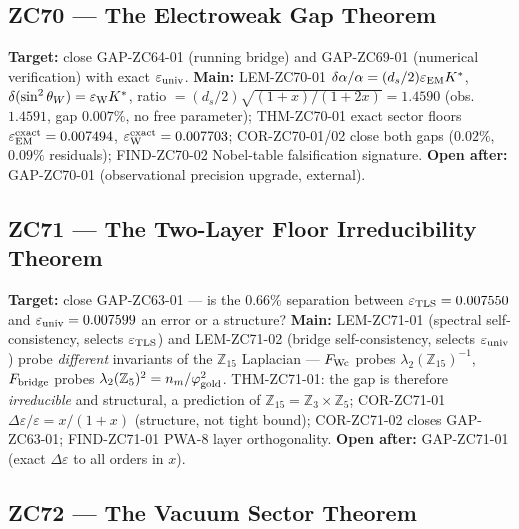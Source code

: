 \documentclass[11pt, a4paper]{article}
\newcommand{\swsq}{\sin^2\theta_W}
\newcommand{\Ztf}{\mathbb{Z}_{15}}
\newcommand{\Zth}{\mathbb{Z}_3}
\newcommand{\Zfi}{\mathbb{Z}_5}
\newcommand{\phig}{\varphi_{\rm gold}}
\newcommand{\Kstar}{K^*}
\begin{document}
\subsection{ZC70 --- The Electroweak Gap Theorem}

\begin{zcbox}[title={ZC70: THM-ZC70-01 --- Electroweak Gap (Exact at $R_0$)}]
\sloppy
\textbf{Target:} close GAP-ZC64-01 (running bridge) and GAP-ZC69-01
(numerical verification) with exact $\varepsilon_{\rm univ}$. \textbf{Main:}
LEM-ZC70-01 $\delta\alpha/\alpha=(d_s/2)\varepsilon_{\rm EM}\Kstar$,
$\delta(\swsq)=\varepsilon_{\rm W}\Kstar$, ratio
$=(d_s/2)\sqrt{(1{+}x)/(1{+}2x)}=1.4590$ (obs.\ $1.4591$, gap $0.007\%$,
no free parameter); THM-ZC70-01 exact sector floors
$\varepsilon_{\rm EM}^{\rm exact}=0.007494$, $\varepsilon_{\rm W}^{\rm exact}=0.007703$;
COR-ZC70-01/02 close both gaps ($0.02\%$, $0.09\%$ residuals);
FIND-ZC70-02 Nobel-table falsification signature.
\textbf{Open after:} GAP-ZC70-01 (observational precision upgrade, external).
\end{zcbox}

\subsection{ZC71 --- The Two-Layer Floor Irreducibility Theorem}

\begin{zcbox}[title={ZC71: THM-ZC71-01 --- Two-Layer Floor (Exact at $R_0$)}]
\sloppy
\textbf{Target:} close GAP-ZC63-01 --- is the $0.66\%$ separation between
$\varepsilon_{\rm TLS}=0.007550$ and $\varepsilon_{\rm univ}=0.007599$ an
error or a structure? \textbf{Main:} LEM-ZC71-01 (spectral self-consistency,
selects $\varepsilon_{\rm TLS}$) and LEM-ZC71-02 (bridge self-consistency,
selects $\varepsilon_{\rm univ}$) probe \emph{different} invariants of the
$\Ztf$ Laplacian --- $F_{\rm Wc}$ probes $\lambda_2(\Ztf)^{-1}$,
$F_{\rm bridge}$ probes $\lambda_2(\Zfi)^2=n_m/\phig^2$. THM-ZC71-01: the
gap is therefore \emph{irreducible} and structural, a prediction of
$\Ztf=\Zth\times\Zfi$; COR-ZC71-01 $\Delta\varepsilon/\varepsilon=x/(1{+}x)$
(structure, not tight bound); COR-ZC71-02 closes GAP-ZC63-01; FIND-ZC71-01
PWA-8 layer orthogonality. \textbf{Open after:} GAP-ZC71-01 (exact
$\Delta\varepsilon$ to all orders in $x$).
\end{zcbox}

\subsection{ZC72 --- The Vacuum Sector Theorem}
\end{document}
